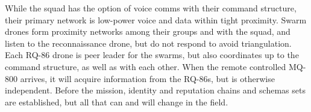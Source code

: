 %
%
%

While the squad has the option of voice comms with their command structure, their primary network is low-power voice and data within tight proximity.
Swarm drones form proximity networks among their groups and with the squad, and listen to the reconnaissance drone, but do not respond to avoid triangulation.
Each RQ-86 drone is peer leader for the swarms, but also coordinates up to the command structure, as well as with each other.
When the remote controlled MQ-800 arrives, it will acquire information from the RQ-86s, but is otherwise independent.
Before the mission, identity and reputation chains and schemas sets are established, but all that can and will change in the field.

